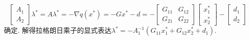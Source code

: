 \documentclass{SBCbookchapter}
\numberwithin{equation}{section}
\begin{document}
\begin{equation}
\label{eq:quadratic-programming-eq-lambda}
\begin{bmatrix} A_1 \\ A_2 \end{bmatrix} \lambda^* = A \lambda^* = -\nabla q(x^*) = - G x^* - d = - \begin{bmatrix} G_{11} & G_{12} \\ G_{21} & G_{22} \end{bmatrix} \begin{bmatrix} x_1^* \\ x_2^* \end{bmatrix} - \begin{bmatrix} d_1 \\ d_2 \end{bmatrix}
\end{equation}
确定. 解得拉格朗日乘子的显式表达$\lambda^* = -A_1^{-1} \left( G_{11}x_1^* + G_{12}x_2^* + d_1 \right).$
\end{document}
